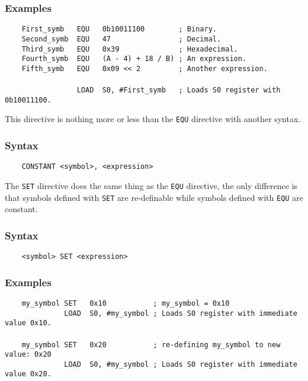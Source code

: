     \subsubsection{Examples}
        \verb'    First_symb   EQU   0b10011100        ; Binary.'\\
        \verb'    Second_symb  EQU   47                ; Decimal.'\\
        \verb'    Third_symb   EQU   0x39              ; Hexadecimal.'\\
        \verb'    Fourth_symb  EQU   (A - 4) + 18 / B) ; An expression.'\\
        \verb'    Fifth_symb   EQU   0x09 << 2         ; Another expression.'\\
        \verb''\\
        \verb'                 LOAD  S0, #First_symb   ; Loads S0 register with 0b10011100.'

    This directive is nothing more or less than the \texttt{EQU} directive with another syntax.

    \subsubsection{Syntax}
        \verb'    CONSTANT <symbol>, <expression>'

    The \texttt{SET} directive does the same thing as the \texttt{EQU} directive, the only difference is that symbols defined with \texttt{SET} are re-definable while symbols defined with \texttt{EQU} are constant.

    \subsubsection{Syntax}
        \verb'    <symbol> SET <expression>'

    \subsubsection{Examples}
        \verb'    my_symbol SET   0x10           ; my_symbol = 0x10'\\
        \verb'              LOAD  S0, #my_symbol ; Loads S0 register with immediate value 0x10.'\\
        \verb''\\
        \verb'    my_symbol SET   0x20           ; re-defining my_symbol to new value: 0x20'\\
        \verb'              LOAD  S0, #my_symbol ; Loads S0 register with immediate value 0x20.'


